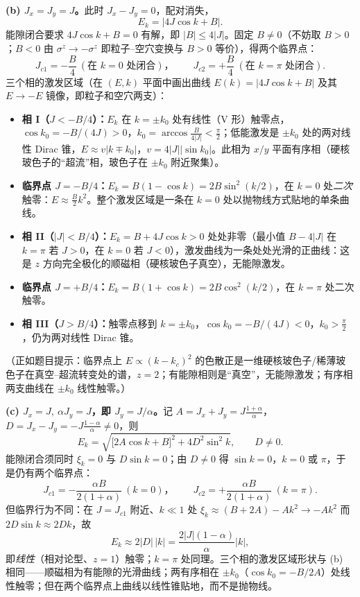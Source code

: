 \textbf{(b) $J_x=J_y=J$。}此时 $J_x-J_y=0$，配对消失，
\begin{equation*}
E_k=\big|4J\cos k+B\big| .
\end{equation*}
能隙闭合要求 $4J\cos k+B=0$ 有解，即 $|B|\le4|J|$。固定 $B\ne0$（不妨取 $B>0$；$B<0$ 由 $\sigma^z\to-\sigma^z$ 即粒子--空穴变换与 $B>0$ 等价），得两个临界点：
\begin{equation*}
\boxed{\;J_{c1}=-\frac{B}{4}\ (\text{在 }k=0\text{ 处闭合})，\qquad
J_{c2}=+\frac{B}{4}\ (\text{在 }k=\pi\text{ 处闭合}) .\;}
\end{equation*}
三个相的激发区域（在 $(E,k)$ 平面中画出曲线 $E(k)=|4J\cos k+B|$ 及其 $E\to-E$ 镜像，即粒子和空穴两支）：

\begin{itemize}
\item \textbf{相 I（$J<-B/4$）：}$E_k$ 在 $k=\pm k_0$ 处有线性（V 形）触零点，$\cos k_0=-B/(4J)>0$，$k_0=\arccos\frac{B}{4|J|}<\frac{\pi}{2}$；低能激发是 $\pm k_0$ 处的两对线性 Dirac 锥，$E\approx v|k\mp k_0|$，$v=4|J||\sin k_0|$。此相为 $x/y$ 平面有序相（硬核玻色子的“超流”相，玻色子在 $\pm k_0$ 附近聚集）。
\item \textbf{临界点 $J=-B/4$：}$E_k=B(1-\cos k)=2B\sin^2(k/2)$，在 $k=0$ 处\emph{二次}触零：$E\approx\frac{B}{2}k^2$。整个激发区域是一条在 $k=0$ 处以抛物线方式贴地的单条曲线。
\item \textbf{相 II（$|J|<B/4$）：}$E_k=B+4J\cos k>0$ 处处非零（最小值 $B-4|J|$ 在 $k=\pi$ 若 $J>0$，在 $k=0$ 若 $J<0$），激发曲线为一条处处光滑的正曲线：这是 $z$ 方向完全极化的顺磁相（硬核玻色子真空），无能隙激发。
\item \textbf{临界点 $J=+B/4$：}$E_k=B(1+\cos k)=2B\cos^2(k/2)$，在 $k=\pi$ 处二次触零。
\item \textbf{相 III（$J>B/4$）：}触零点移到 $k=\pm k_0$，$\cos k_0=-B/(4J)<0$，$k_0>\frac{\pi}{2}$，仍为两对线性 Dirac 锥。
\end{itemize}
（正如题目提示：临界点上 $E\propto(k-k_c)^2$ 的色散正是一维硬核玻色子/稀薄玻色子在真空--超流转变处的谱，$z=2$；有能隙相则是“真空”，无能隙激发；有序相两支曲线在 $\pm k_0$ 线性触零。）

\textbf{(c) $J_x=J,\ \alpha J_y=J$，即 $J_y=J/\alpha$。}记 $A=J_x+J_y=J\frac{1+\alpha}{\alpha}$，$D=J_x-J_y=-J\frac{1-\alpha}{\alpha}\neq0$，则
\begin{equation*}
E_k=\sqrt{\big[2A\cos k+B\big]^2+4D^2\sin^2k},\qquad D\neq0 .
\end{equation*}
能隙闭合须同时 $\xi_k=0$ 与 $D\sin k=0$；由 $D\neq0$ 得 $\sin k=0$，$k=0$ 或 $\pi$，于是仍有两个临界点：
\begin{equation*}
\boxed{\;J_{c1}=-\frac{\alpha B}{2(1+\alpha)}\ (k=0)，\qquad
J_{c2}=+\frac{\alpha B}{2(1+\alpha)}\ (k=\pi) .\;}
\end{equation*}
但临界行为不同：在 $J=J_{c1}$ 附近、$k\ll1$ 处 $\xi_k\approx(B+2A)-Ak^2\to-Ak^2$ 而 $2D\sin k\approx2Dk$，故
\begin{equation*}
E_k\approx2|D|\,|k|=\frac{2|J|(1-\alpha)}{\alpha}|k| ,
\end{equation*}
即\emph{线性}（相对论型、$z=1$）触零；$k=\pi$ 处同理。三个相的激发区域形状与 (b) 相同——顺磁相为有能隙的光滑曲线；两有序相在 $\pm k_0$（$\cos k_0=-B/2A$）处线性触零；但在两个临界点上曲线以线性锥贴地，而不是抛物线。

